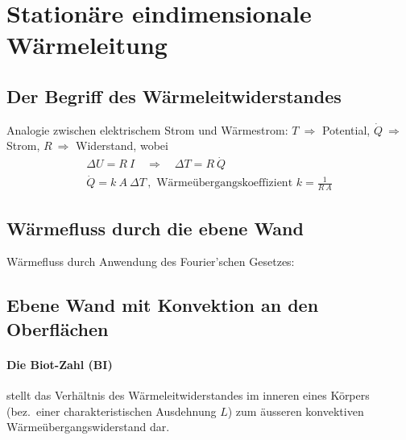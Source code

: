 
\section{Stationäre eindimensionale Wärmeleitung} %
	\subsection{Der Begriff des Wärmeleitwiderstandes} %
		Analogie zwischen elektrischem Strom und Wärmestrom: $T \ \Rightarrow$ Potential, $\dot Q \ \Rightarrow$ Strom, $R \ \Rightarrow$ Widerstand, wobei
		\begin{gather*}
			\Delta U = R \: I \quad \Rightarrow \quad \Delta T = R \: \dot Q \\
			\dot Q = k \: A \: \Delta T \,, \text{ Wärmeübergangskoeffizient } k = \frac{1}{R\: A}
		\end{gather*}

	\subsection{Wärmefluss durch die ebene Wand} %

		Wärmefluss durch Anwendung des Fourier'schen Gesetzes:

	\subsection{Ebene Wand mit Konvektion an den Oberflächen} %
		\paragraph{Die Biot-Zahl (BI)} %
			stellt das Verhältnis des Wär\-me\-leit\-wi\-der\-stan\-des im inneren eines Körpers (bez.~einer charakteristischen Ausdehnung $L$) zum äusseren konvektiven Wärme\-über\-gangswiderstand dar.

